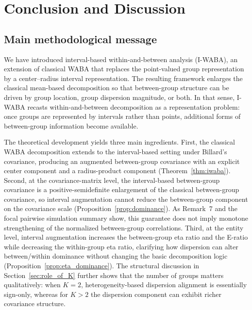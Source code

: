 \documentclass[preprint, times, 12pt, authoryear]{elsarticle}
\begin{document}
\section{Conclusion and Discussion}\label{sec:conclusion}

\subsection{Main methodological message}

We have introduced interval-based within-and-between analysis (I-WABA), an extension of classical WABA that replaces the point-valued group representation by a center--radius interval representation. The resulting framework enlarges the classical mean-based decomposition so that between-group structure can be driven by group location, group dispersion magnitude, or both. In that sense, I-WABA recasts within-and-between decomposition as a representation problem: once groups are represented by intervals rather than points, additional forms of between-group information become available.

The theoretical development yields three main ingredients. First, the classical WABA decomposition extends to the interval-based setting under Billard's covariance, producing an augmented between-group covariance with an explicit center component and a radius-product component (Theorem~\ref{thm:iwaba}). Second, at the covariance-matrix level, the interval-based between-group covariance is a positive-semidefinite enlargement of the classical between-group covariance, so interval augmentation cannot reduce the between-group component on the covariance scale (Proposition~\ref{prop:dominance}). As Remark~7 and the focal pairwise simulation summary show, this guarantee does not imply monotone strengthening of the normalized between-group correlations. Third, at the entity level, interval augmentation increases the between-group eta ratio and the E-ratio while decreasing the within-group eta ratio, clarifying how dispersion can alter between/within dominance without changing the basic decomposition logic (Proposition~\ref{prop:eta_dominance}). The structural discussion in Section~\ref{sec:role_of_K} further shows that the number of groups matters qualitatively: when $K=2$, heterogeneity-based dispersion alignment is essentially sign-only, whereas for $K>2$ the dispersion component can exhibit richer covariance structure.
\end{document}

